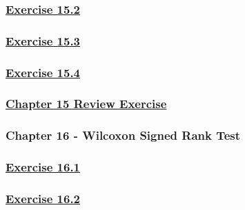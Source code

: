 \documentclass[
  11pt,
]{book}
\begin{document}
\subsubsection*{\texorpdfstring{\hyperref[ex152q]{Exercise 15.2}}{Exercise 15.2}}\label{exercise-15.2-1}

\subsubsection*{\texorpdfstring{\hyperref[ex153q]{Exercise 15.3}}{Exercise 15.3}}\label{exercise-15.3-1}

\subsubsection*{\texorpdfstring{\hyperref[ex154q]{Exercise 15.4}}{Exercise 15.4}}\label{exercise-15.4-1}

\subsubsection*{\texorpdfstring{\hyperref[re15q]{Chapter 15 Review Exercise}}{Chapter 15 Review Exercise}}\label{chapter-15-review-exercise}

\subsubsection*{Chapter 16 - Wilcoxon Signed Rank Test}\label{chapter-16---wilcoxon-signed-rank-test}

\subsubsection*{\texorpdfstring{\hyperref[ex161q]{Exercise 16.1}}{Exercise 16.1}}\label{exercise-16.1-1}

\subsubsection*{\texorpdfstring{\hyperref[ex162q]{Exercise 16.2}}{Exercise 16.2}}\label{exercise-16.2-1}
\end{document}
